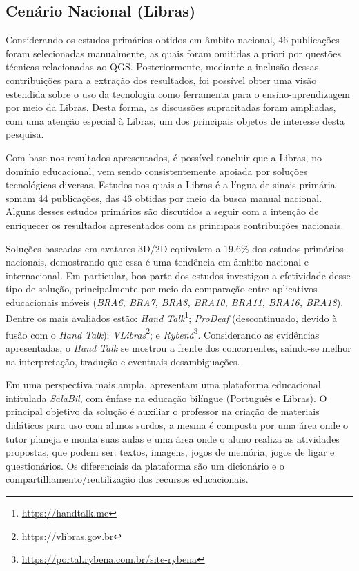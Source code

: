 \subsection{Cenário Nacional (Libras)}
\label{ms:cenario-nacional}

Considerando os estudos primários obtidos em âmbito nacional, 46 publicações foram selecionadas manualmente, as quais foram omitidas a priori por questões técnicas relacionadas ao QGS. Posteriormente, mediante a inclusão dessas contribuições para a extração dos resultados, foi possível obter uma visão estendida sobre o uso da tecnologia como ferramenta para o ensino-aprendizagem por meio da Libras. Desta forma, as discussões supracitadas foram ampliadas, com uma atenção especial à Libras, um dos principais objetos de interesse desta pesquisa.

Com base nos resultados apresentados, é possível concluir que a Libras, no domínio educacional, vem sendo consistentemente apoiada por soluções tecnológicas diversas. Estudos nos quais a Libras é a língua de sinais primária somam 44 publicações, das 46 obtidas por meio da busca manual nacional. Alguns desses estudos primários são discutidos a seguir com a intenção de enriquecer os resultados apresentados com as principais contribuições nacionais.

Soluções baseadas em avatares 3D/2D equivalem a 19,6\% dos estudos primários nacionais, demostrando que essa é uma tendência em âmbito nacional e internacional. Em particular, boa parte dos estudos investigou a efetividade desse tipo de solução, principalmente por meio da comparação entre aplicativos educacionais móveis (\textit{BRA6, BRA7, BRA8, BRA10, BRA11, BRA16, BRA18}). Dentre os mais avaliados estão: \textit{Hand Talk}\footnote{\url{https://handtalk.me}}; \textit{ProDeaf} (descontinuado, devido à fusão com o \textit{Hand Talk}); \textit{VLibras}\footnote{\url{https://vlibras.gov.br}}; e \textit{Rybená}\footnote{\url{https://portal.rybena.com.br/site-rybena}}. Considerando as evidências apresentadas, o \textit{Hand Talk} se mostrou a frente dos concorrentes, saindo-se melhor na interpretação, tradução e eventuais desambiguações.

Em uma perspectiva mais ampla,  apresentam uma plataforma educacional intitulada \textit{SalaBil}, com ênfase na educação bilíngue (Português e Libras). O principal objetivo da solução é auxiliar o professor na criação de materiais didáticos para uso com alunos surdos, a mesma é composta por uma área onde o tutor planeja e monta suas aulas e uma área onde o aluno realiza as atividades propostas, que podem ser: textos, imagens, jogos de memória, jogos de ligar e questionários. Os diferenciais da plataforma são um dicionário e o compartilhamento/reutilização dos recursos educacionais.

